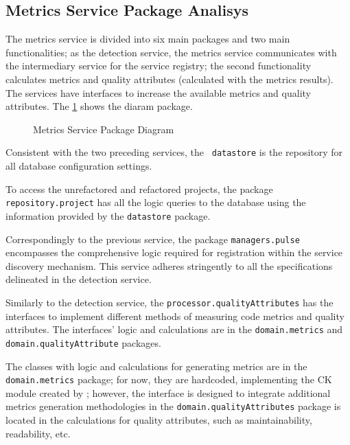 \subsection{Metrics Service Package Analisys}
\label{sub-metrics-packages}

The metrics service is divided into six main packages and two main functionalities; as the detection service, the metrics service communicates with the intermediary service for the service registry; the second functionality calculates metrics and quality attributes (calculated with the metrics results). The services have interfaces to increase the available metrics and quality attributes. The \cref{fig-package-metrics} shows the diaram package.

\begin{figure}[ht!]
\SetCaptionWidth{\textwidth}
\caption{Metrics Service Package Diagram}
\label{fig-package-metrics}
\fontsize{9}{10}\selectfont

\end{figure}
\FloatBarrier

Consistent with the two preceding services, the \texttt{ datastore} is the repository for all database configuration settings.

To access the unrefactored and refactored projects, the package \texttt{repository.project} has all the logic queries to the database using the information provided by the \texttt{datastore} package.

Correspondingly to the previous service, the package \texttt{managers.pulse} encompasses the comprehensive logic required for registration within the service discovery mechanism. This service adheres stringently to all the specifications delineated in the detection service.

Similarly to the detection service, the \texttt{processor.qualityAttributes} has the interfaces to implement different methods of measuring code metrics and quality attributes. The interfaces' logic and calculations are in the \texttt{domain.metrics} and \texttt{domain.qualityAttribute} packages.

The classes with logic and calculations for generating metrics are in the \texttt{domain.metrics} package; for now, they are hardcoded, implementing the CK module created by \textcite{ck}; however, the interface is designed to integrate additional metrics generation methodologies in the \texttt{domain.qualityAttributes} package is located in the calculations for quality attributes, such as maintainability, readability, etc.

